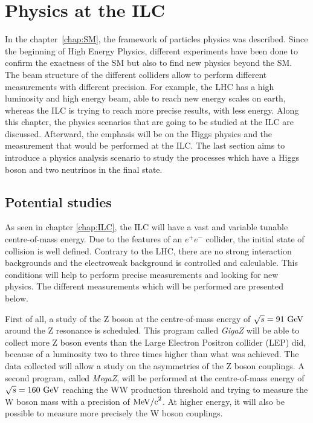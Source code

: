 \chapter{Physics at the ILC}
\label{chap:phyiscs}

  In the chapter~\ref{chap:SM}, the framework of particles physics was described. 
  Since the beginning of High Energy Physics, different experiments have been done to confirm the exactness of the SM but also to find new physics beyond the SM. 
  The beam structure of the different colliders allow to perform different measurements with different precision. 
  For example, the LHC has a high luminosity and high energy beam, able to reach new energy scales on earth, whereas the ILC is trying to reach more precise results, with less energy. 
  Along this chapter, the physics scenarios that are going to be studied at the ILC are discussed. 
  Afterward, the emphasis will be on the Higgs physics and the measurement that would be performed at the ILC. 
  The last section aims to introduce a physics analysis scenario to study the processes which have a Higgs boson and two neutrinos in the final state.
 
 \minitoc

  \section{Potential studies}

  As seen in chapter \ref{chap:ILC}, the ILC will have a vast and variable tunable centre-of-mass energy.
  Due to the features of an $e^+e^-$ collider, the initial state of collision is well defined.
  Contrary to the LHC, there are no strong interaction backgrounds and the electroweak background is controlled and calculable.
  This conditions will help to perform precise measurements and looking for new physics. 
  The different measurements which will be performed are presented below.

   First of all, a study of the Z boson at the centre-of-mass energy of $\sqrt{s} = 91~\rm{GeV}$ around the Z resonance is scheduled. 
   This program called \textit{GigaZ} will be able to collect more Z boson events than the Large Electron Positron collider (LEP) did, because of a luminosity two to three times higher than what was achieved. 
   The data collected will allow a study on the asymmetries of the Z boson couplings. 
   A second program, called \textit{MegaZ}, will be performed at the centre-of-mass energy of $\sqrt{s} = 160~\rm{GeV}$ reaching the WW production threshold and trying to measure the W boson mass with a precision of $\rm{MeV/c}^2$.
   At higher energy, it will also be possible to measure more precisely the W boson couplings.

